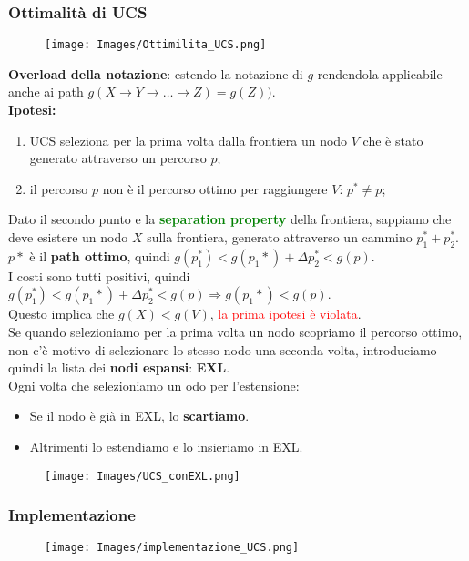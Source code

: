 \documentclass{article}
\begin{document}
\subsubsection{Ottimalità di UCS}
\begin{figure}[H]
    \texttt{[image: Images/Ottimilita\_UCS.png]}
\end{figure}
\textbf{Overload della notazione}: estendo la notazione di $g$ rendendola applicabile anche ai path $g(X → Y → \dots → Z) = g(Z))$.
\\ \textbf{Ipotesi:}
\begin{enumerate}
    \item UCS seleziona per la prima volta dalla frontiera un nodo $V$ che è stato generato attraverso un percorso $p$;
    \item il percorso $p$ non è il percorso ottimo per raggiungere $V$: $p^* \neq p$;
\end{enumerate}
Dato il secondo punto e la \textcolor{green}{\textbf{separation property}} della frontiera, sappiamo che deve esistere un nodo $X$ sulla frontiera, generato attraverso un cammino $p_1^*+ p_2^*$. \\
$p*$ è il \textbf{path ottimo}, quindi $g(p_1^*)<g(p_1*)+\Delta{p_2^*} < g(p)$.
\\ I costi sono tutti positivi, quindi $g(p_1^*)<g(p_1*)+\Delta{p_2^*} < g(p) \Rightarrow g(p_1*) <g(p)$.
\\ Questo implica che $g(X)<g(V)$, \textcolor{red}{la prima ipotesi è violata}.
\\ Se quando selezioniamo per la prima volta un nodo scopriamo il percorso ottimo, non c'è motivo di selezionare lo stesso nodo una seconda volta, introduciamo quindi la lista dei \textbf{nodi espansi}: \textbf{EXL}.
\\ Ogni volta che selezioniamo un odo per l'estensione:
\begin{itemize}
    \item Se il nodo è già in EXL, lo \textbf{scartiamo}.
    \item Altrimenti lo estendiamo e lo insieriamo in EXL.
\end{itemize}

\begin{figure}[H]
    \texttt{[image: Images/UCS\_conEXL.png]}
\end{figure}

\subsubsection{Implementazione}
\begin{figure}[H]
    \texttt{[image: Images/implementazione\_UCS.png]}
\end{figure}
\end{document}
